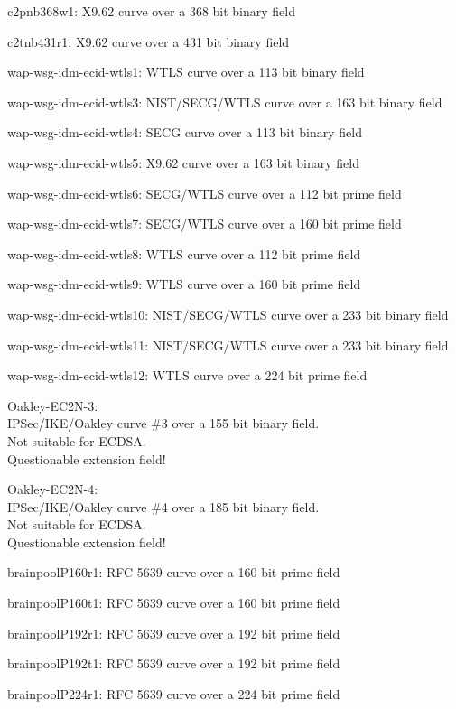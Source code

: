 \item   c2pnb368w1: X9.62 curve over a 368 bit binary field
\item   c2tnb431r1: X9.62 curve over a 431 bit binary field
\item   wap-wsg-idm-ecid-wtls1: WTLS curve over a 113 bit binary field
\item   wap-wsg-idm-ecid-wtls3: NIST/SECG/WTLS curve over a 163 bit binary field
\item   wap-wsg-idm-ecid-wtls4: SECG curve over a 113 bit binary field
\item   wap-wsg-idm-ecid-wtls5: X9.62 curve over a 163 bit binary field
\item   wap-wsg-idm-ecid-wtls6: SECG/WTLS curve over a 112 bit prime field
\item   wap-wsg-idm-ecid-wtls7: SECG/WTLS curve over a 160 bit prime field
\item   wap-wsg-idm-ecid-wtls8: WTLS curve over a 112 bit prime field
\item   wap-wsg-idm-ecid-wtls9: WTLS curve over a 160 bit prime field
\item   wap-wsg-idm-ecid-wtls10: NIST/SECG/WTLS curve over a 233 bit binary field
\item   wap-wsg-idm-ecid-wtls11: NIST/SECG/WTLS curve over a 233 bit binary field
\item   wap-wsg-idm-ecid-wtls12: WTLS curve over a 224 bit prime field
\item   Oakley-EC2N-3: \\
	IPSec/IKE/Oakley curve \#3 over a 155 bit binary field. \\
	Not suitable for ECDSA. \\
	Questionable extension field!
\item   Oakley-EC2N-4: \\
	IPSec/IKE/Oakley curve \#4 over a 185 bit binary field. \\
	Not suitable for ECDSA. \\
	Questionable extension field!
\item   brainpoolP160r1: RFC 5639 curve over a 160 bit prime field
\item   brainpoolP160t1: RFC 5639 curve over a 160 bit prime field
\item   brainpoolP192r1: RFC 5639 curve over a 192 bit prime field
\item   brainpoolP192t1: RFC 5639 curve over a 192 bit prime field
\item   brainpoolP224r1: RFC 5639 curve over a 224 bit prime field
